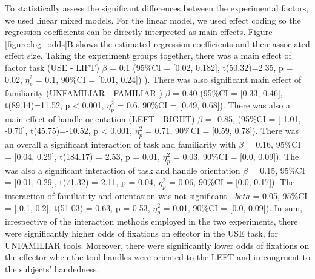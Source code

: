 To statistically assess the significant differences between the experimental factors, we used linear mixed models. For the linear model, we used effect coding so the regression coefficients can be directly interpreted as main effects. Figure \ref{figure:log_odds}B shows the estimated regression coefficients and their associated effect size. Taking the experiment groups together, there was a main effect of factor task (USE - LIFT) $\beta$ = 0.1 (95\%CI = [0.02, 0.182], t(50.32)=2.35, p = 0.02, $\eta_p^2$ = 0.1, 90\%CI = [0.01, 0.24]) ). There was also significant main effect of familiarity (UNFAMILIAR - FAMILIAR ) $\beta$ = 0.40  (95\%CI = [0.33, 0.46], t(89.14)=11.52, p < 0.001, $\eta_p^2$ = 0.6, 90\%CI = [0.49, 0.68]). There was also a main effect of handle orientation (LEFT - RIGHT) $\beta$ = -0.85, (95\%CI = [-1.01, -0.70], t(45.75)=-10.52, p < 0.001, $\eta_p^2$ = 0.71, 90\%CI = [0.59, 0.78]). There was an overall a significant interaction of task and familiarity with $\beta$ = 0.16, 95\%CI = [0.04, 0.29], t(184.17) = 2.53, p = 0.01, $\eta_p^2$ = 0.03, 90\%CI = [0.0, 0.09]).  The was also a significant interaction of task and handle orientation $\beta$ = 0.15, 95\%CI = [0.01, 0.29], t(71.32) = 2.11, p = 0.04, $\eta_p^2$ = 0.06, 90\%CI = [0.0, 0.17]). The interaction of familiarity and orientation was not significant , $beta$ = 0.05, 95\%CI = [-0.1, 0.2], t(51.03) = 0.63, p = 0.53, $\eta_p^2$ = 0.01, 90\%CI = [0.0, 0.09]). In sum, irrespective of the interaction methods employed in the two experiments, there were significantly higher odds of fixations on effector in the USE task, for UNFAMILIAR tools. Moreover, there were significantly lower odds of fixations on the effector when the tool handles were oriented to the LEFT and in-congruent to the subjects' handedness.

